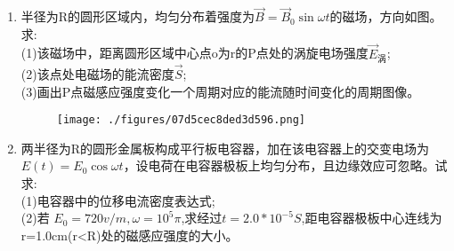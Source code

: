 \begin{enumerate}
(1)电子圆运动在其轨道中心产生的磁感应强度B的大小;\\
(2)电子圆运动的轨道磁矩$P_m$的大小。
\item 半径为R的圆形区域内，均匀分布着强度为$\vec B=\vec B_0 \sin \omega t$的磁场，方向如图。求:\\
(1)该磁场中，距离圆形区域中心点o为r的P点处的涡旋电场强度$\vec E_\text{涡}$;\\
(2)该点处电磁场的能流密度$\vec S$;\\
(3)画出P点磁感应强度变化一个周期对应的能流随时间变化的周期图像。
\begin{figure}[ht]
\centering
\texttt{[image: ./figures/07d5cec8ded3d596.png]}
\caption{} \label{fig_SSD10_2}
\end{figure}
\item 两半径为R的圆形金属板构成平行板电容器，加在该电容器上的交变电场为$E(t)=E_0 \cos \omega t$，设电荷在电容器极板上均匀分布，且边缘效应可忽略。试求:\\
(1)电容器中的位移电流密度表达式;\\
(2)若 $E_0=720v/m,\omega=10^5\pi$,求经过$t=2.0*10^{-5}S$,距电容器极板中心连线为r=1.0cm(r<R)处的磁感应强度的大小。
\end{enumerate}
